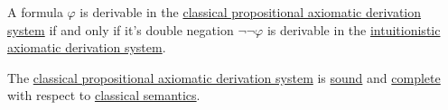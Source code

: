 \begin{theorem}\label{thm:glivenkos_double_negation_theorem}
  A formula \( \varphi \) is derivable in the \hyperref[def:propositional_axiomatic_derivation_system]{classical propositional axiomatic derivation system} if and only if it's double negation \( \neg \neg \varphi \) is derivable in the \hyperref[def:intuitionistic_propositional_axiomatic_derivation_system]{intuitionistic axiomatic derivation system}.
\end{theorem}

\begin{theorem}\label{thm:classical_propositional_logic_is_sound_and_complete}
  The \hyperref[def:propositional_axiomatic_derivation_system]{classical propositional axiomatic derivation system} is \hyperref[def:derivability_and_satisfiability/soundness]{sound} and \hyperref[def:derivability_and_satisfiability/completeness]{complete} with respect to \hyperref[def:propositional_semantics]{classical semantics}.
\end{theorem}

